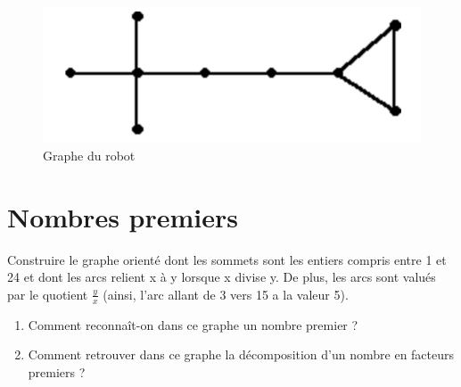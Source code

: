 \documentclass{article}[12pt]
\begin{document}
\begin{figure}[h!]
    \centering
    \includegraphics{Robot.png}
    \caption{Graphe du robot}
    \label{fig:robot}
\end{figure}

\section*{Nombres premiers}

Construire le graphe orienté dont les sommets sont les entiers compris entre 1 et 24 et dont les arcs relient x à y lorsque x divise y. De plus, les arcs sont valués par le quotient $\frac{y}{x}$ (ainsi, l’arc allant de 3 vers 15 a la valeur 5).

\begin{enumerate}
    \item Comment reconnaît-on dans ce graphe un nombre premier ?
    \item Comment retrouver dans ce graphe la décomposition d’un nombre en facteurs premiers ?
\end{enumerate}
\end{document}
